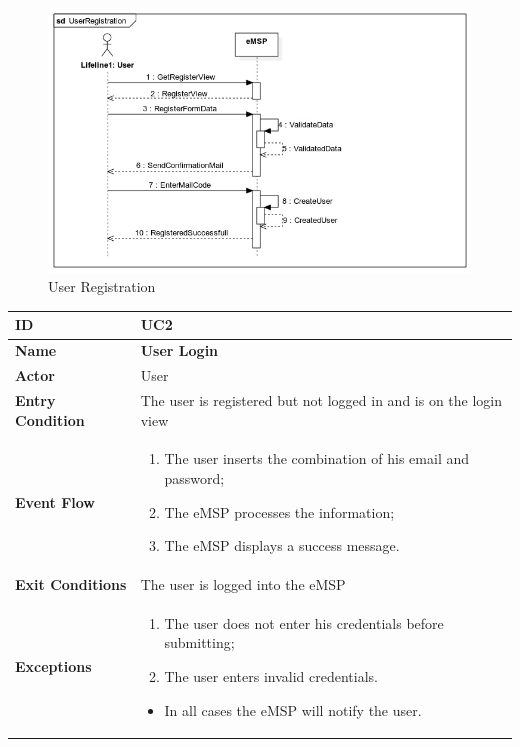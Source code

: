 \documentclass{Configuration_Files/PoliMi3i_thesis}
\begin{document}
\begin{figure}[H]
    \centering
    \includegraphics[width=1\textwidth]{Images/UseCases/UserRegistration.jpg}
    \caption{User Registration}
\end{figure}


\newpage\begin{table}[H]
    \begin{xltabular}{\textwidth}{| >{}l | X |}
    \hline
    \textbf{ID} & \textbf{UC2}\T\B\\
    \hline
    \textbf{Name} & \textbf{User Login}\T\B\\
    \hline \hline
    \textbf{Actor} & User\T\B \\
    \hline
    \textbf{Entry Condition} & The user is registered but not logged in and is on the login view\T\B\\
    \hline
    \textbf{Event Flow} & 
        \begin{enumerate}
        \item The user inserts the combination of his email and password;
        \item The eMSP processes the information;
        \item The eMSP displays a success message.
        \end{enumerate}\B\\
    \hline
    \textbf{Exit Conditions} & The user is logged into the eMSP\B\\
    \hline
    \textbf{Exceptions} & \begin{enumerate}
        \item The user does not enter his credentials before submitting;
        \item The user enters invalid credentials.
        \end{enumerate}
        \begin{itemize}
            \item In all cases the eMSP will notify the user.
        \end{itemize}\B\\
    \hline
    \end{xltabular}
\end{table}
\end{document}
